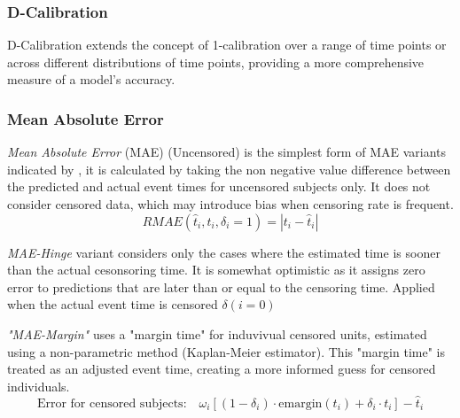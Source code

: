 \subsubsection{D-Calibration}
\noindent D-Calibration \parencite{haider_effective_2018} extends the concept of 1-calibration over a range of time points or across different distributions of time points, providing a more comprehensive measure of a model's accuracy.


\subsubsection{Mean Absolute Error}
\par \noindent \textit{Mean Absolute Error} (MAE) (Uncensored) is the simplest form of MAE variants indicated by \parencite{qi_effective_2023}, it is calculated by taking the non negative value difference between the predicted and actual event times for uncensored subjects only. It does not consider censored data, which may introduce bias when censoring rate is frequent.
\begin{equation} \label{eq:rmae}
RMAE (\hat{t}_i, t_i, \delta_i = 1) = |t_i - \hat{t}_i|
\end{equation}
\par \noindent \textit{MAE-Hinge} variant \parencite{qi_effective_2023} considers only the cases where the estimated time is sooner than the actual cesonsoring time. It is somewhat optimistic as it assigns zero error to predictions that are later than or equal to the censoring time. Applied when the actual event time is censored \(\delta (i =0)\)
\par \noindent \textit{"MAE-Margin"} \parencite{qi_effective_2023} uses a "margin time" for induvivual censored units, estimated using a non-parametric method (Kaplan-Meier estimator). This "margin time" is treated as an adjusted event time, creating a more informed guess for censored individuals.
\begin{equation} \label{eq:maemargin}
\text{Error for censored subjects:} \quad \omega_i[(1 - \delta_i) \cdot \text{emargin}(t_i) + \delta_i \cdot t_i] - \hat{t}_i
\end{equation}
